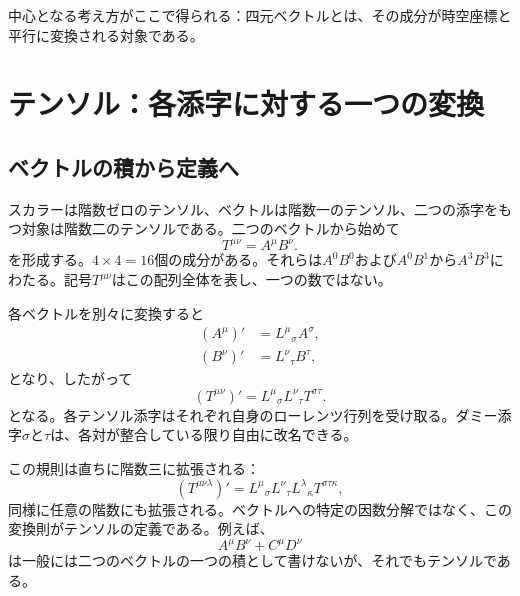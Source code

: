 中心となる考え方がここで得られる：四元ベクトルとは、その成分が時空座標と平行に変換される対象である。

\section{テンソル：各添字に対する一つの変換}

\subsection{ベクトルの積から定義へ}

スカラーは階数ゼロのテンソル、ベクトルは階数一のテンソル、二つの添字をもつ対象は階数二のテンソルである。二つのベクトルから始めて
\begin{equation}
T^{\mu\nu}=A^\mu B^\nu.
\label{eq:sr6-simple-tensor}
\end{equation}
を形成する。\(4\times4=16\)個の成分がある。それらは\(A^0B^0\)および\(A^0B^1\)から\(A^3B^3\)にわたる。記号\(T^{\mu\nu}\)はこの配列全体を表し、一つの数ではない。

各ベクトルを別々に変換すると
\begin{align}
(A^\mu)'&=L^\mu{}_\sigma A^\sigma,\\
(B^\nu)'&=L^\nu{}_\tau B^\tau,
\end{align}
となり、したがって
\begin{equation}
(T^{\mu\nu})'
=
L^\mu{}_\sigma L^\nu{}_\tau T^{\sigma\tau}.
\label{eq:sr6-rank-two-transform}
\end{equation}
となる。各テンソル添字はそれぞれ自身のローレンツ行列を受け取る。ダミー添字\(\sigma\)と\(\tau\)は、各対が整合している限り自由に改名できる。

\begin{classroomqa}
\end{classroomqa}

この規則は直ちに階数三に拡張される：
\begin{equation}
(T^{\mu\nu\lambda})'
=
L^\mu{}_\sigma
L^\nu{}_\tau
L^\lambda{}_\kappa
T^{\sigma\tau\kappa},
\label{eq:sr6-rank-three-transform}
\end{equation}
同様に任意の階数にも拡張される。ベクトルへの特定の因数分解ではなく、この変換則がテンソルの定義である。例えば、
\begin{equation}
A^\mu B^\nu+C^\mu D^\nu
\end{equation}
は一般には二つのベクトルの一つの積として書けないが、それでもテンソルである。

